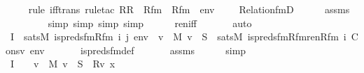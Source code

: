 \begin{isabellebody}
\ \ \ \ \isamarkupfalse%
{\isacharparenleft}{\kern0pt}rule\ iff{\isacharunderscore}{\kern0pt}trans{\isacharcomma}{\kern0pt}\ rule{\isacharunderscore}{\kern0pt}tac\ R{\isacharequal}{\kern0pt}R\ \ Rfm\ {\isacharequal}{\kern0pt}\ Rfm\ \ env\ {\isacharequal}{\kern0pt}\ {\isachardoublequoteopen}{\isacharbrackleft}{\kern0pt}{\isacharbrackright}{\kern0pt}{\isachardoublequoteclose}\ \ \ Relation{\isacharunderscore}{\kern0pt}fmD{\isacharparenright}{\kern0pt}\isanewline
\ \ \ \ \isamarkupfalse%
\ assms\ \isanewline
\ \ \ \ \ \ \ \ \isamarkupfalse%
{\isacharparenleft}{\kern0pt}simp\ {\isacharcomma}{\kern0pt}simp\ {\isacharcomma}{\kern0pt}simp\ {\isacharcomma}{\kern0pt}simp{\isacharparenright}{\kern0pt}\isanewline
\ \ \ \ \isamarkupfalse%
\ ren{\isacharunderscore}{\kern0pt}iff\ \isanewline
\ \ \ \ \isamarkupfalse%
\ auto\isanewline
\isanewline
\ \ \isamarkupfalse%
\ I{}\ {\isacharcolon}{\kern0pt}\ {\isachardoublequoteopen}sats{\isacharparenleft}{\kern0pt}M{\isacharcomma}{\kern0pt}\ is{\isacharunderscore}{\kern0pt}preds{\isacharunderscore}{\kern0pt}fm{\isacharparenleft}{\kern0pt}Rfm{\isacharcomma}{\kern0pt}\ i{\isacharcomma}{\kern0pt}\ j{\isacharparenright}{\kern0pt}{\isacharcomma}{\kern0pt}\ env{\isacharparenright}{\kern0pt}\ {\isasymlongleftrightarrow}\ {\isacharparenleft}{\kern0pt}{\isasymforall}v\ {\isasymin}\ M{\isachardot}{\kern0pt}\ {\isacharparenleft}{\kern0pt}v\ {\isasymin}\ S\ {\isasymlongleftrightarrow}\ sats{\isacharparenleft}{\kern0pt}M{\isacharcomma}{\kern0pt}\ is{\isacharunderscore}{\kern0pt}preds{\isacharunderscore}{\kern0pt}fm{\isacharunderscore}{\kern0pt}Rfm{\isacharunderscore}{\kern0pt}ren{\isacharparenleft}{\kern0pt}Rfm{\isacharcomma}{\kern0pt}\ i{\isacharparenright}{\kern0pt}{\isacharcomma}{\kern0pt}\ Cons{\isacharparenleft}{\kern0pt}v{\isacharcomma}{\kern0pt}\ env{\isacharparenright}{\kern0pt}{\isacharparenright}{\kern0pt}{\isacharparenright}{\kern0pt}{\isacharparenright}{\kern0pt}{\isachardoublequoteclose}\ \isanewline
\ \ \ \ \isamarkupfalse%
\ is{\isacharunderscore}{\kern0pt}preds{\isacharunderscore}{\kern0pt}fm{\isacharunderscore}{\kern0pt}def\ \isanewline
\ \ \ \ \isamarkupfalse%
\ assms\isanewline
\ \ \ \ \isamarkupfalse%
\ simp\isanewline
\ \ \isamarkupfalse%
\ I{}\ {\isacharcolon}{\kern0pt}\ {\isachardoublequoteopen}{\isachardot}{\kern0pt}{\isachardot}{\kern0pt}{\isachardot}{\kern0pt}\ {\isasymlongleftrightarrow}\ {\isacharparenleft}{\kern0pt}{\isasymforall}v\ {\isasymin}\ M{\isachardot}{\kern0pt}\ {\isacharparenleft}{\kern0pt}v\ {\isasymin}\ S\ {\isasymlongleftrightarrow}\ R{\isacharparenleft}{\kern0pt}v{\isacharcomma}{\kern0pt}\ x{\isacharparenright}{\kern0pt}{\isacharparenright}{\kern0pt}{\isacharparenright}{\kern0pt}{\isachardoublequoteclose}\isanewline

\end{isabellebody}
